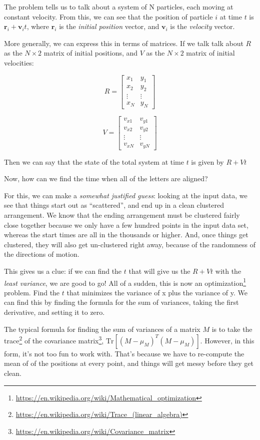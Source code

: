 \documentclass[]{article}
\renewcommand{\href}[2]{#2\footnote{\url{#1}}}
\begin{document}
The problem tells us to talk about a system of N particles, each moving at
constant velocity. From this, we can see that the position of particle \(i\) at
time \(t\) is \(\mathbf{r}_i  + \mathbf{v}_i t\), where \(\mathbf{r}_i\) is the
\emph{initial position} vector, and \(\mathbf{v}_i\) is the \emph{velocity}
vector.

More generally, we can express this in terms of matrices. If we talk talk about
\(R\) as the \(N \times 2\) matrix of initial positions, and \(V\) as the \(N
\times 2\) matrix of initial velocities:

\[
R =
\begin{bmatrix}
x_1 & y_1 \\
x_2 & y_2 \\
\vdots & \vdots \\
x_N & y_N
\end{bmatrix}
\]

\[
V =
\begin{bmatrix}
v_{x1} & v_{y1} \\
v_{x2} & v_{y2} \\
\vdots & \vdots \\
v_{xN} & v_{yN}
\end{bmatrix}
\]

Then we can say that the state of the total system at time \(t\) is given by
\(R +
V t\)

Now, how can we find the time when all of the letters are aligned?

For this, we can make a \emph{somewhat justified guess}: looking at the input
data, we see that things start out as ``scattered'', and end up in a clean
clustered arrangement. We know that the ending arrangement must be clustered
fairly close together because we only have a few hundred points in the input
data set, whereas the start times are all in the thousands or higher. And, once
things get clustered, they will also get un-clustered right away, because of the
randomness of the directions of motion.

This gives us a clue: if we can find the \(t\) that will give us the \(R + V t\)
with the \emph{least variance}, we are good to go! All of a sudden, this is now
an \href{https://en.wikipedia.org/wiki/Mathematical_optimization}{optimization}
problem. Find the \(t\) that minimizes the variance of x plus the variance of y.
We can find this by finding the formula for the sum of variances, taking the
first derivative, and setting it to zero.

The typical formula for finding the sum of variances of a matrix \(M\) is to
take the \href{https://en.wikipedia.org/wiki/Trace_(linear_algebra)}{trace} of
the \href{https://en.wikipedia.org/wiki/Covariance_matrix}{covariance matrix},
\(\mathrm{Tr} \left[ \left(M - \mu_M
\right)^T \left(M - \mu_M \right) \right]\). However, in this form, it's not too
fun to work with. That's because we have to re-compute the mean of of the
positions at every point, and things will get messy before they get clean.
\end{document}

